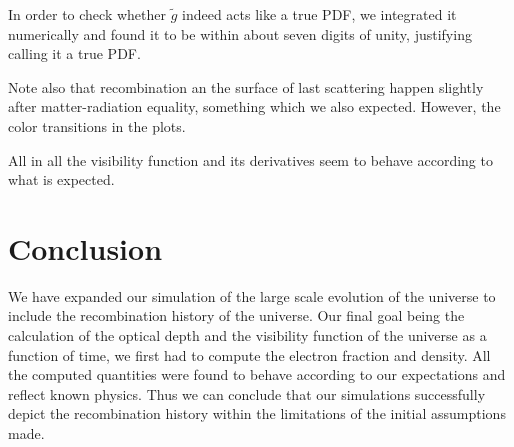 \documentclass[twocolumn]{aastex62}
\begin{document}
In order to check whether $\tilde{g}$ indeed acts like a true PDF, we integrated it numerically and found it to be within about seven digits of unity, justifying calling it a true PDF.

Note also that recombination an the surface of last scattering happen slightly after matter-radiation equality, something which we also expected. However, the color transitions in the plots.

All in all the visibility function and its derivatives seem to behave according to what is expected.

\section{Conclusion} \label{sec:Conclusion}
We have expanded our simulation of the large scale evolution of the universe to include the recombination history of the universe. Our final goal being the calculation of the optical depth and the visibility function of the universe as a function of time, we first had to compute the electron fraction and density. All the computed quantities were found to behave according to our expectations and reflect known physics. Thus we can conclude that our simulations successfully depict the recombination history within the limitations of the initial assumptions made.



\end{document}
